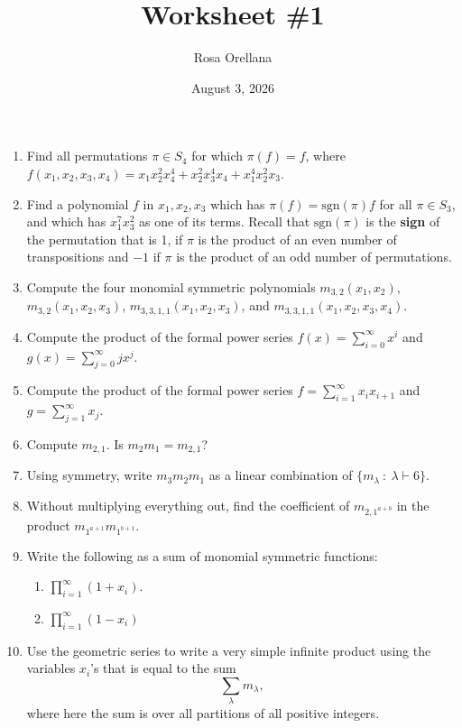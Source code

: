 \documentclass{article}
\title{Worksheet \#1}
\author{Rosa Orellana}
\date{August 3, 2026}
\begin{document}
\maketitle
\begin{enumerate}
\item Find all permutations $\pi\in S_4$ for which $\pi(f) = f$, where $f(x_1, x_2, x_3,x_4) = x_1x_2^2x_4^4 + x_2^2x_3^4x_4+x_1^4x_2^2x_3$. 

\item Find a polynomial $f$ in $x_1, x_2, x_3$ which has $\pi(f) = \text{sgn}(\pi) f$ for all $\pi\in S_3$, and which has $x_1^7x_3^2$ as one of its terms. Recall that $\text{sgn}(\pi)$ is the {\bf sign}
of the permutation that is 1, if $\pi$ is the product of an even number of transpositions and $-1$ if $\pi$ is the product of an odd number of permutations. 

\item Compute the four monomial symmetric polynomials $m_{3,2}(x_1,x_2)$,\  $m_{3,2}(x_1,x_2,x_3)$, $m_{3,3,1,1}(x_1,x_2,x_3)$, and $m_{3,3,1,1}(x_1,x_2,x_3,x_4)$. 

\item Compute the product of the formal power series $f(x) = \sum_{i = 0} ^\infty x^i$ and $g(x) = \sum_{j=0}^\infty jx^j$. 

\item Compute the product of the formal power series $f= \sum_{i=1}^\infty x_ix_{i+1}$ and $g=\sum_{j=1}^\infty x_j$.  

\item Compute $m_{2,1}$. Is $m_2m_1 = m_{2,1}$? 

\item Using symmetry, write $m_3m_2m_1$ as a linear combination of $\{m_\lambda\ : \ \lambda \vdash 6\}$.

\item Without multiplying everything out, find the coefficient of $m_{2,1^{a+b}}$ in the product $m_{1^{a+1}}m_{1^{b+1}}$. 

\item Write the following as a sum of monomial symmetric functions: 
\begin{enumerate}
\item $\prod_{i=1}^\infty (1+x_i)$.
\item $\prod_{i=1}^\infty (1-x_i)$
\end{enumerate}

\item Use the geometric series to write a very simple infinite product using the variables $x_i$'s that is equal to the sum 
\[ \sum_\lambda m_\lambda,\, \]
where here the sum is over all partitions of all positive integers. 
\end{enumerate}
\end{document}
